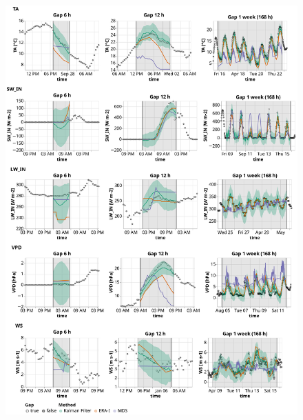\documentclass{article}
\begin{document}
\begin{figure}
\centerline{\includegraphics[width=5.7in]{timeseries_1}}
\caption{}
\label{fig:ts_1-1}
\end{figure}
\restoregeometry
\end{document}
